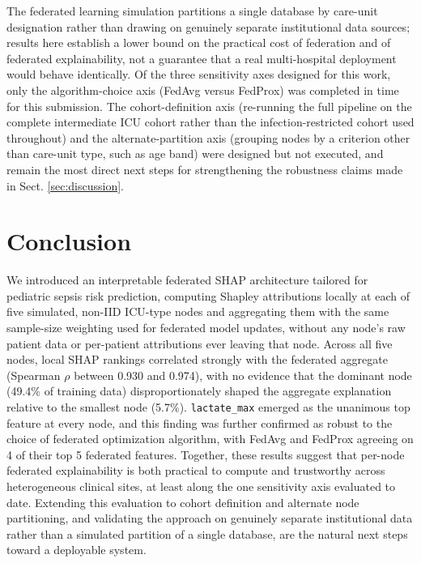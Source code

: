 \documentclass[runningheads]{llncs}
\begin{document}
The federated learning simulation partitions a single database by care-unit designation rather than drawing on genuinely separate institutional data sources; results here establish a lower bound on the practical cost of federation and of federated explainability, not a guarantee that a real multi-hospital deployment would behave identically. Of the three sensitivity axes designed for this work, only the algorithm-choice axis (FedAvg versus FedProx) was completed in time for this submission. The cohort-definition axis (re-running the full pipeline on the complete intermediate ICU cohort rather than the infection-restricted cohort used throughout) and the alternate-partition axis (grouping nodes by a criterion other than care-unit type, such as age band) were designed but not executed, and remain the most direct next steps for strengthening the robustness claims made in Sect. \ref{sec:discussion}.

\section{Conclusion}\label{sec:concl}

We introduced an interpretable federated SHAP architecture tailored for pediatric sepsis risk prediction, computing Shapley attributions locally at each of five simulated, non-IID ICU-type nodes and aggregating them with the same sample-size weighting used for federated model updates, without any node's raw patient data or per-patient attributions ever leaving that node. Across all five nodes, local SHAP rankings correlated strongly with the federated aggregate (Spearman $\rho$ between 0.930 and 0.974), with no evidence that the dominant node (49.4\% of training data) disproportionately shaped the aggregate explanation relative to the smallest node (5.7\%). \texttt{lactate\_max} emerged as the unanimous top feature at every node, and this finding was further confirmed as robust to the choice of federated optimization algorithm, with FedAvg and FedProx agreeing on 4 of their top 5 federated features. Together, these results suggest that per-node federated explainability is both practical to compute and trustworthy across heterogeneous clinical sites, at least along the one sensitivity axis evaluated to date. Extending this evaluation to cohort definition and alternate node partitioning, and validating the approach on genuinely separate institutional data rather than a simulated partition of a single database, are the natural next steps toward a deployable system.



\end{document}
